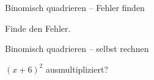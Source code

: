 \begin{aufgabe}{Binomisch quadrieren – Fehler finden}
\begin{teile}
\teil Finde den Fehler. 
\end{teile}
\end{aufgabe}

\begin{aufgabe}{Binomisch quadrieren – selbst rechnen}
\begin{teile}
\teil $(x + 6)^2$ ausmultipliziert? \leerfeld
\end{teile}
\end{aufgabe}
